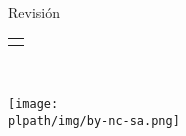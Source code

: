 
\thispagestyle{empty}
	
	\begin{center}
		\makeatletter
		{\bf {\Huge \@title}}
		\\[2cm]
		{\bf {\huge \subtitlename}}\\[4cm]
		\@date\\[2cm]
		{\footnotesize Revisión \revname}
		\\[5cm]
		\begin{tabular}[t]{c} \@author \end{tabular}\\[2cm]
		\makeatother
		
		\begin{center}
			\texttt{[image: \\plpath/img/by-nc-sa.png]}
		\end{center}
	\end{center}

\cleardoublepage


